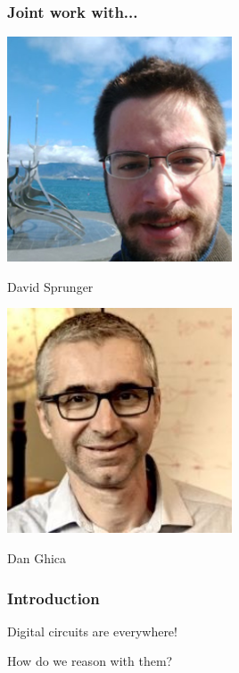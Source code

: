 \begin{frame}
    \frametitle{Joint work with...}

    \begin{minipage}{0.49\textwidth}
        \centering
        \includegraphics[width=0.5\textwidth]{imgs/sprunger}
        
        David Sprunger
    \end{minipage}
    \begin{minipage}{0.49\textwidth}
        \centering
        \includegraphics[width=0.5\textwidth]{imgs/ghica}
        
        Dan Ghica
    \end{minipage}

\end{frame}

\begin{frame}
    \frametitle{Introduction}
    
    Digital circuits are everywhere!

    \pause

    How do we reason with them?

\end{frame}

